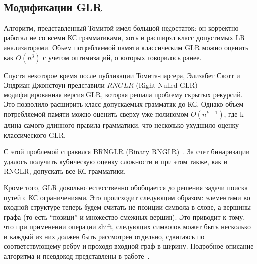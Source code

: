 \begin{example}
\begin{enumerate}
        \\
    \end{enumerate}



\end{example}

\subsection{Модификации GLR}
Алгоритм, представленный Томитой имел большой недостаток: он корректно работал не со всеми КС грамматиками, хоть и расширял класс допустимых LR анализаторами. Объем потребляемой памяти классическим GLR можно оценить как $ O(n^3)$ с учетом оптимизаций, о которых говорилось ранее.

Спустя некоторое время после публикации Томита-парсера, Элизабет Скотт и Эндриан Джонстоун представили $RNGLR$ (Right Nulled GLR)~\cite{Scott:2006:RNG:1146809.1146810} --- модифицированная версия GLR, которая решала проблему скрытых рекурсий. Это позволило расширить класс допускаемых грамматик до КС. Однако объем потребляемой памяти можно оценить сверху уже полиномом $O(n^{k+1})$, где k --- длина самого длинного правила грамматики, что несколько ухудшило оценку классического GLR.

С этой проблемой справился BRNGLR (Binary RNGLR)~\cite{Scott:2007:BCT:1289813.1289815}. За счет бинаризации удалось получить кубическую оценку сложности и при этом также, как и RNGLR, допускать все КС грамматики.

Кроме того, GLR довольно естесственно обобщается до решения задачи поиска путей с КС ограничениями. Это происходит следующим образом: элементами во входной структуре теперь будем считать не позиции символа в слове, а вершины графа (то есть ``позици'' и множество смежных вершин). Это приводит к тому, что при применении операции shift, следующих символов может быть несколько и каждый из них должен быть рассмотрен отдельно, сдвигаясь по соответствующему ребру и проходя входной граф в ширину. Подробное описание алгоритма и псевдокод представлены в работе~\cite{10.1007/978-3-319-41579-6_22}.

